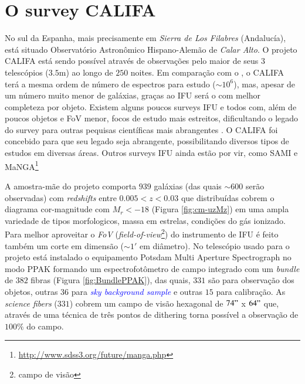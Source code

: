 \section{O survey CALIFA}
\label{sec:CALePyC:Apresent}

No sul da Espanha, mais precisamente em {\em Sierra de Los Filabres} (Andalucía), está situado Observatório Astronômico
Hispano-Alemão de {\em Calar Alto}. O projeto CALIFA está sendo possível através de observações pelo maior de seus $3$
telescópios ($3.5$m) ao longo de $250$ noites. Em comparação com o \SDSS, o CALIFA terá a mesma ordem de número de
espectros para estudo ($\sim10^6$), mas, apesar de um número muito menor de galáxias, graças ao IFU será o com melhor
completeza por objeto. Existem alguns poucos surveys IFU e todos com, além de poucos objetos e FoV menor, focos de
estudo mais estreitos, dificultando o legado do survey para outras pequisas científicas mais abrangentes \citep[SAURON;
][região central de 72 galáxias com $z < 0.01$.]{de-Zeeuw2002} \citep[PINGS; ][algumas galáxias muito próximas ($\sim
10$ Mpc) e o estudo atual de 70 (U)LIRGs com $z <0.26$]{RosalesOrtega2010} \citep[VENGA; ][$30$ galáxias
espirais]{Blanc2010}. O CALIFA foi concebido para que seu legado seja  abrangente, possibilitando diversos tipos de
estudos em diversas áreas. Outros surveys IFU ainda estão por vir, como SAMI \citep{Croom2012} e
MaNGA\footnote{\url{http://www.sdss3.org/future/manga.php}}


A amostra-mãe do projeto comporta $939$ galáxias (das quais $\sim 600$ serão observadas) com {\em redshifts} entre
$0.005 < z < 0.03$ que distribuídas cobrem o diagrama cor-magnitude com $M_r < -18$ (Figura \ref{fig:cm-uzMz}) em uma
ampla variedade de tipos morfologicos, massa em estrelas, condições do gás ionizado.
Para melhor aproveitar o {\em FoV} ({\em field-of-view}\footnote{campo de visão}) do instrumento de IFU é feito também
um corte em dimensão ($\sim1'$ em diâmetro). No telescópio usado para o projeto está instalado o equipamento Potsdam
Multi Aperture Spectrograph \citep[PMAS; ][]{Roth2005} no modo PPAK \citep{Verheijen2004, Kelz2006} formando um
espectrofotômetro de campo integrado com um {\em bundle} de $382$ fibras (Figura \ref{fig:BundlePPAK}), das quais, $331$
são para observação dos objetos, outras $36$ para \ojo \textcolor{blue}{\em sky background sample} e outras $15$ para
calibração. As {\em science fibers} ($331$) cobrem um campo de visão hexagonal de $74"$ x $64"$ que, através de uma
técnica de três pontos de dithering \ojo torna possível a observação de $100\%$ do campo.

